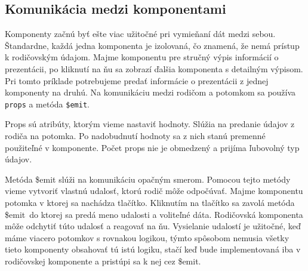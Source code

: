 \subsection*{Komunikácia medzi komponentami}
Komponenty začnú byť ešte viac užitočné pri vymieňaní dát medzi sebou. Štandardne, každá jedna komponenta je izolovaná, čo znamená, že nemá prístup k rodičovským údajom. Majme komponentu pre stručný výpis informácií o prezentácii, po kliknutí na ňu sa zobrazí ďalšia komponenta s detailným výpisom. Pri tomto príklade potrebujeme predať informácie o prezentácii z jednej komponenty na druhú. Na komunikáciu medzi rodičom a potomkom sa používa \texttt{props} a metóda \texttt{\$emit}.

Props sú atribúty, ktorým vieme nastaviť hodnoty. Slúžia na predanie údajov z rodiča na potomka. Po nadobudnutí hodnoty sa z nich stanú premenné použiteľné v komponente. Počet props nie je obmedzený a prijíma ľubovolný typ údajov.

Metóda \$emit slúži na komunikáciu opačným smerom. Pomocou tejto metódy vieme vytvoriť vlastnú udalosť, ktorú rodič môže odpočúvať. Majme komponentu potomka v ktorej sa nachádza tlačítko. Kliknutím na tlačítko sa zavolá metóda \$emit\, do ktorej sa predá meno udalosti a voliteľné dáta. Rodičovská komponenta môže odchytiť túto udalosť a reagovať na ňu. Vysielanie udalostí je užitočné, keď máme viacero potomkov s rovnakou logikou, týmto spôsobom nemusia všetky tieto komponenty obsahovať tú istú logiku, stačí keď bude implementovaná iba v rodičovskej komponente a pristúpi sa k nej cez \$emit.

